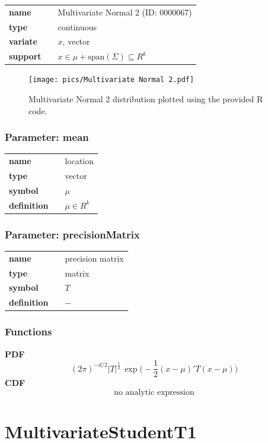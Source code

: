 \documentclass{article}
\begin{document}
  \bigskip 

\begin{tabular}{p{2cm}cl}
\textbf{name} & & Multivariate Normal 2 (ID: 0000067)\\ 
 
\textbf{type} & & continuous \\ 

\textbf{variate} & & $x$, vector \\ 

\textbf{support} & & $x \in \mu + \text{span}(\Sigma) \subseteq  R^k$
\end{tabular}

\begin{figure}[ht!]
\centering
  \texttt{[image: pics/Multivariate Normal 2.pdf]}
 \caption{Multivariate Normal 2 distribution plotted using the provided R code.}
 \label{fig:Multivariate Normal 2}
\end{figure}

\subsubsection*{Parameter: mean}

\noindent\begin{tabular}{p{2cm}cl}
\textbf{name} & & location \\
\textbf{type} & & vector \\
\textbf{symbol} & & $\mu$  \\
\textbf{definition} & & $\mu \in R^k$
\end{tabular}
\subsubsection*{Parameter: precisionMatrix}

\noindent\begin{tabular}{p{2cm}cl}
\textbf{name} & & precision matrix \\
\textbf{type} & & matrix \\
\textbf{symbol} & & $T$  \\
\textbf{definition} & & $-$
\end{tabular}
\subsubsection*{Functions}

\smallskip \noindent \hspace{.2cm} \textbf{PDF} 
\begin{equation*}(2\pi)^{-d/2}|T|^{\frac{1}{2}}\, \exp\big( -\frac{1}{2}(x-\mu)' T (x-\mu) \big)\end{equation*}
\smallskip \noindent \hspace{.2cm} \textbf{CDF} 
\begin{equation*}\text{no analytic expression}\end{equation*}
\smallskip\section*{MultivariateStudentT1} 
\end{document}
